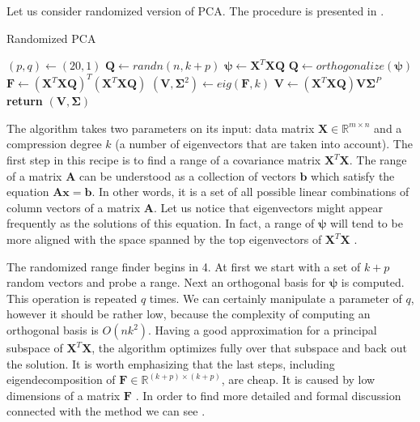 \documentclass[english,a4paper,twoside]{ppfcmthesis}
\begin{document}
Let us consider randomized version of PCA. The procedure is presented in  . 
\begin{algorithm}
    \caption{Randomized PCA}\label{alg:rpca1}
    \begin{algorithmic}[1]
        \State $(p,q) \gets (20,1)$
        \State $\boldsymbol{Q} \gets randn(n, k+p)$
                \State $\boldsymbol{\psi} \gets \boldsymbol{X}^T\boldsymbol{X}\boldsymbol{Q}$
                \State $\boldsymbol{Q} \gets orthogonalize(\boldsymbol{\psi})$
            \EndFor
            \State $\boldsymbol{F} \gets (\boldsymbol{X}^T\boldsymbol{X}\boldsymbol{Q})^T(\boldsymbol{X}^T\boldsymbol{X}\boldsymbol{Q})$
            \State $(\boldsymbol{V},\boldsymbol{\Sigma}^2) \gets eig(\boldsymbol{F},k)$
            \State $\boldsymbol{V} \gets (\boldsymbol{X}^T\boldsymbol{X}\boldsymbol{Q})\boldsymbol{V}\boldsymbol{\Sigma}^P$
            \State \textbf{return} $(\boldsymbol{V}, \boldsymbol{\Sigma})$
        \EndFunction
    \end{algorithmic}
\end{algorithm}
The algorithm takes two parameters on its input: data matrix $\boldsymbol{X} \in \mathbb{R}^{m \times n}$ and a compression degree $k$ (a number of eigenvectors that are taken into account). The first step in this recipe is to find a range of a covariance matrix $\boldsymbol{X}^T\boldsymbol{X}$. The range of a matrix $\boldsymbol{A}$ can be understood as a collection of vectors $\boldsymbol{b}$ which satisfy the equation $\boldsymbol{A}\boldsymbol{x}=\boldsymbol{b}$. In other words, it is a set of all possible linear combinations of column vectors of a matrix $\boldsymbol{A}$. Let us notice that eigenvectors might appear frequently as the solutions of this equation. In fact, a range of $\boldsymbol{\psi}$ will tend to be more aligned with the space spanned by the top eigenvectors of $\boldsymbol{X}^T\boldsymbol{X}$ \citep{Mineiro}.

The randomized range finder begins in 4. At first we start with a set of $k+p$ random vectors and probe a range. Next an orthogonal basis for $\boldsymbol{\psi}$ is computed. This operation is repeated $q$ times. We can certainly manipulate a parameter of $q$, however it should be rather low, because the complexity of computing an orthogonal basis is $O(nk^2)$. 
Having a good approximation for a principal subspace of $\boldsymbol{X}^T\boldsymbol{X}$, the algorithm optimizes fully over that subspace and back out the solution. It is worth emphasizing that the last steps, including eigendecomposition of $\boldsymbol{F} \in \mathbb{R}^{(k+p) \times (k+p)}$, are cheap. It is caused by low dimensions of a matrix $\boldsymbol{F}$ \citep{Mineiro}. In order to find more detailed and formal discussion connected with the method we can see \citep{Halko}.
\end{document}

